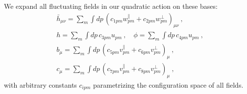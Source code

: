 \documentclass[12pt]{article}
\begin{document}
We expand all fluctuating fields in our quadratic action on these bases: 
\begin{equation}\begin{aligned}
	&\bar{h}_{\mu\nu} = \sum_{m}\int dp\, (c_{1p m} w^{\parallel}_{p m} + c_{2p m} w^{\perp}_{p m})_{\mu\nu}~, \\
	&h = \sum_{m}\int dp\, c_{3p m} u_{p m}~, \quad \phi = \sum_{m}\int dp\, c_{4p m} u_{p m}~, \\
	&b_\mu = \sum_{m}\int dp\, (c_{5p m} v^{\parallel}_{p m} + c_{6p m} v^{\perp}_{p m})_{\mu}~, \\
	&c_\mu = \sum_{m}\int dp\, (c_{7p m} v^{\parallel}_{p m} + c_{8p m} v^{\perp}_{p m})_{\mu}~,
\label{eq:cont_exp}
\end{aligned}\end{equation}
with arbitrary constants $c_{ip m}$ parametrizing the configuration space of all fields. 
\end{document}
